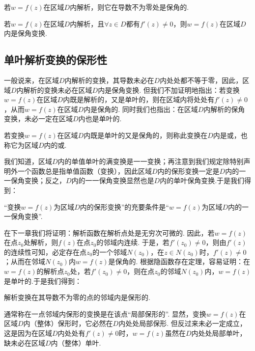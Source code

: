 \begin{theorem}
若\(w = f(z)\)在区域\(D\)内解析，则它在导数不为零处是保角的.
\end{theorem}

\begin{corollary}
若\(w = f(z)\)在区域\(D\)内解析，且\(\forall z \in D\)都有\(f'(z) \neq 0\)，则\(w = f(z)\)在区域\(D\)内是保角变换.
\end{corollary}

\subsection{单叶解析变换的保形性}
一般说来，在区域\(D\)内解析的变换，其导数未必在\(D\)内处处都不等于零，因此，区域\(D\)内解析的变换未必在区域\(D\)内是保角变换.
但我们不加证明地指出：若变换\(w = f(z)\)在区域\(D\)内既是解析的，又是单叶的，则在区域内将处处有\(f'(z)\neq0\)，从而\(w = f(z)\)在区域\(D\)内是保角的.
同时我们也指出：在区域\(D\)内解析的保角变换，未必一定在区域\(D\)内也是单叶的.

\begin{definition}
若变换\(w = f(z)\)在区域\(D\)内既是单叶的又是保角的，则称此变换在\(D\)内是或，也称它为区域\(D\)内的或.
\end{definition}

我们知道，区域\(D\)内的单值单叶的满变换是一一变换；再注意到我们规定除特别声明外一个函数总是指单值函数（变换），因此区域\(D\)内的保形变换一定是\(D\)内的一一保角变换；反之，\(D\)内的一一保角变换显然也是\(D\)内的单叶保角变换.于是我们得到：
\begin{property}
“变换\(w = f(z)\)为区域\(D\)内的保形变换”的充要条件是“\(w = f(z)\)为区域\(D\)内的一一保角变换”.
\end{property}
在下一章我们将证明：解析函数在解析点处是无穷次可微的.
因此，若\(w = f(z)\)在点\(z_0\)处解析，则\(f(z)\)在点\(z_0\)的邻域内连续.
于是，若\(f'(z_0)\neq0\)，则由\(f'(z)\)的连续性可知，必定存在点\(z_0\)的一个邻域\(N(z_0)\)，在\(z \in N(z_0)\)时，\(f'(z)\neq0\)；从而在邻域\(N(z_0)\)内\(w = f(z)\)是保角的.
根据隐函数存在定理，容易证明：在\(w = f(z)\)的解析点\(z_0\)处，若\(f'(z_0)\neq0\)，则在点\(z_0\)的邻域\(N(z_0)\)内，\(w = f(z)\)是单叶的.于是我们得到：
\begin{theorem}
解析变换在其导数不为零的点的邻域内是保形的.
\end{theorem}

通常称在一点邻域内保形的变换是在该点“局部保形的”.
显然，变换\(w = f(z)\)在区域\(D\)内（整体）保形时，它必然在\(D\)内处处局部保形.
但反过来未必一定成立，这是因为在区域\(D\)内处处有\(f'(z)\neq0\)时，\(w = f(z)\)虽然在\(D\)内处处局部单叶，缺未必在区域\(D\)内（整体）单叶.

